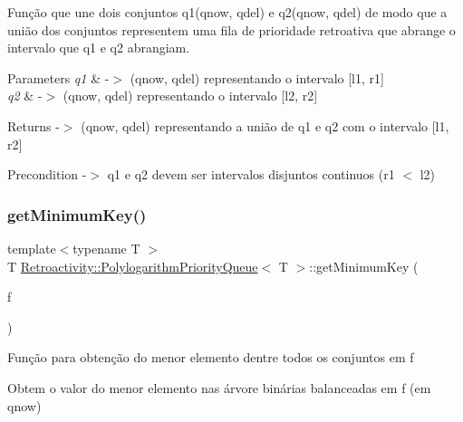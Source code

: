 Função que une dois conjuntos q1(qnow, qdel) e q2(qnow, qdel) de modo que a união dos conjuntos representem uma fila de prioridade retroativa que abrange o intervalo que q1 e q2 abrangiam.


\begin{DoxyParams}{Parameters}
{\em q1} & -\/$>$ (qnow, qdel) representando o intervalo \mbox{[}l1, r1\mbox{]} \\
\hline
{\em q2} & -\/$>$ (qnow, qdel) representando o intervalo \mbox{[}l2, r2\mbox{]} \\
\hline
\end{DoxyParams}
\begin{DoxyReturn}{Returns}
-\/$>$ (qnow, qdel) representando a união de q1 e q2 com o intervalo \mbox{[}l1, r2\mbox{]} 
\end{DoxyReturn}
\begin{DoxyPrecond}{Precondition}
-\/$>$ q1 e q2 devem ser intervalos disjuntos continuos (r1 $<$ l2) 
\end{DoxyPrecond}
\mbox{\label{classRetroactivity_1_1PolylogarithmPriorityQueue_a2ad9a9b51b4be420f0c5a65f6bcc3e41}} 
\subsubsection{\texorpdfstring{get\+Minimum\+Key()}{getMinimumKey()}}
{\footnotesize\ttfamily template$<$typename T $>$ \\
T \hyperlink{classRetroactivity_1_1PolylogarithmPriorityQueue}{Retroactivity\+::\+Polylogarithm\+Priority\+Queue}$<$ T $>$\+::get\+Minimum\+Key (\begin{DoxyParamCaption}\item[{\hyperlink{classRetroactivity_1_1PolylogarithmPriorityQueue_1_1QueryNode}{Query\+Node}}]{f }\end{DoxyParamCaption})}

Função para obtenção do menor elemento dentre todos os conjuntos em f

Obtem o valor do menor elemento nas árvore binárias balanceadas em f (em qnow)



